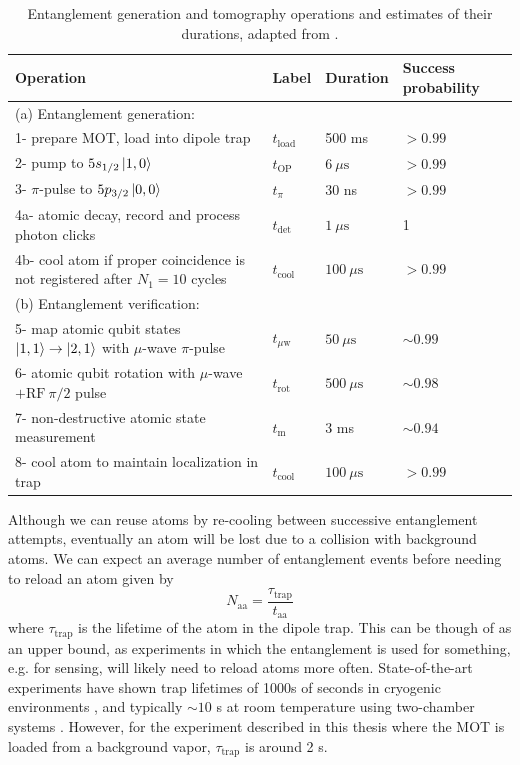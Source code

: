 \begin{table}
    \centering    
    \begin{tabular}{llll}
        \hline Operation & Label & Duration & Success probability \\
        \hline (a) Entanglement generation: & & & \\
        1- prepare MOT, load into dipole trap & $t_{\textrm{load}}$ & 500 ms & $>0.99$ \\
        2- pump to $5 s_{1 / 2}\ket{1,0}$ & $t_{\textrm{OP}}$ & $6 ~\mu \mathrm{s}$ & $>0.99$ \\
        3- $\pi$-pulse to $5 p_{3 / 2}\ket{0,0}$ & $t_\pi$ & 30 ns & $>0.99$ \\
        4a- atomic decay, record and process photon clicks & $t_{\text {det }}$ & $1 ~\mu \mathrm{s}$ & 1 \\
        4b- cool atom if proper coincidence is not registered after $N_1=10$ cycles & $t_{\textrm{cool}}$ & $100 ~\mu \mathrm{s}$ & $>0.99$ \\
        (b) Entanglement verification: & & & \\
        5- map atomic qubit states $\ket{1,1} \rightarrow \ket{2,1}$ with $\mu$-wave $\pi$-pulse & $t_{\mu \textrm{w}}$ & $50 ~\mu \mathrm{s}$ & $\sim 0.99$ \\
        6- atomic qubit rotation with $\mu$-wave $+\mathrm{RF}~\pi / 2$ pulse & $t_{\mathrm{rot}}$ & $500 ~\mu \mathrm{s}$ & $\sim 0.98$ \\
        7- non-destructive atomic state measurement & $t_{\textrm{m}}$ & 3 ms & $\sim 0.94$\cite{Kwon2017} \\
        8- cool atom to maintain localization in trap & $t_{\textrm{cool}}$ & $100 ~\mu \mathrm{s}$ &$>0.99$ \\
        \hline
    \end{tabular}
    \caption{Entanglement generation and tomography operations and estimates of their durations, adapted from \cite{Young2022}.}
    \label{tab:entanglement_steps}
\end{table}
\newpage

Although we can reuse atoms by re-cooling between successive entanglement attempts, eventually an atom will be lost due to a collision with background atoms. We can expect an average number of entanglement events before needing to reload an atom given by 
\begin{equation}
    N_{\text{aa}} = \frac{\tau_{\text{trap}}}{t_{\text{aa}}}
\end{equation}
where $\tau_{\text{trap}}$ is the lifetime of the atom in the dipole trap. This can be though of as an upper bound, as experiments in which the entanglement is used for something, e.g. for sensing, will likely need to reload atoms more often. State-of-the-art experiments have shown trap lifetimes of 1000s of seconds in cryogenic environments \cite{Schymik2021}, and typically $\sim10$ s at room temperature using two-chamber systems \cite{Graham2022}. However, for the experiment described in this thesis where the MOT is loaded from a background vapor, $\tau_{\text{trap}}$ is around 2 s.

